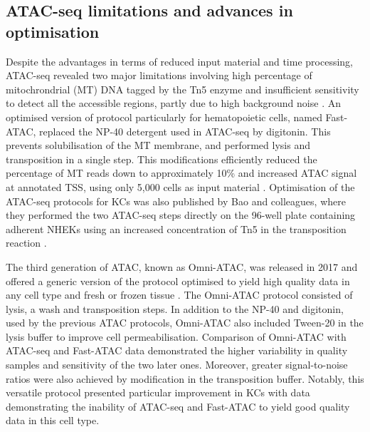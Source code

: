 \subsection{ATAC-seq limitations and advances in optimisation}  
Despite the advantages in terms of reduced input material and time processing, ATAC-seq revealed two major limitations involving high percentage of mitochrondrial (MT) DNA tagged by the Tn5 enzyme and insufficient sensitivity to detect all the accessible regions, partly due to high background noise \parencite{Corces2016, Sos2016}. An optimised version of protocol particularly for hematopoietic cells, named Fast-ATAC, replaced the NP-40 detergent used in ATAC-seq by digitonin. This prevents solubilisation of the MT membrane, and performed lysis and transposition in a single step. This modifications efficiently reduced the percentage of MT reads down to approximately 10\% and increased ATAC signal at annotated TSS, using only 5,000 cells as input material \parencite{Corces2016}. Optimisation of the ATAC-seq protocols for KCs was also published by Bao and colleagues, where they performed the two ATAC-seq steps directly on the 96-well plate containing adherent NHEKs using an increased concentration of Tn5 in the transposition reaction \parencite{Bao2015}.


The third generation of ATAC, known as Omni-ATAC, was released in 2017 and offered a generic version of the protocol optimised to yield high quality data in any cell type and fresh or frozen tissue \parencite{Corces2017}. The Omni-ATAC protocol consisted of lysis, a wash and transposition steps. In addition to the NP-40 and digitonin, used by the previous ATAC protocols, Omni-ATAC also included Tween-20 in the lysis buffer to improve cell permeabilisation. Comparison of Omni-ATAC with ATAC-seq and Fast-ATAC data demonstrated the higher variability in quality samples and sensitivity of the two later ones. Moreover, greater signal-to-noise ratios were also achieved by modification in the transposition buffer. Notably, this versatile protocol presented particular improvement in KCs with data demonstrating the inability of ATAC-seq and Fast-ATAC to yield good quality data in this cell type.  



